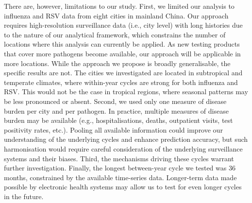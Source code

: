 
There are, however, limitations to our study.
First, we limited our analysis to influenza and RSV data from eight cities in mainland China.
Our approach requires high-resolution surveillance data (i.e., city level) with long histories due to the nature of our analytical framework, which constrains the number of locations where this analysis can currently be applied.
As new testing products that cover more pathogens become available, our approach will be applicable in more locations.
While the approach we propose is broadly generalisable, the specific results are not.
The cities we investigated are located in subtropical and temperate climates, where within-year cycles are strong for both influenza and RSV.
This would not be the case in tropical regions, where seasonal patterns may be less pronounced or absent.
Second, we used only one measure of disease burden per city and per pathogen.
In practice, multiple measures of disease burden may be available (e.g., hospitalisations, deaths, outpatient visits, test positivity rates, etc.).
Pooling all available information could improve our understanding of the underlying cycles and enhance prediction accuracy, but such harmonisation would require careful consideration of the underlying surveillance systems and their biases.
Third, the mechanisms driving these cycles warrant further investigation.
Finally, the longest between-year cycle we tested was 36 months, constrained by the available time-series data.
Longer-term data made possible by electronic health systems may allow us to test for even longer cycles in the future.

